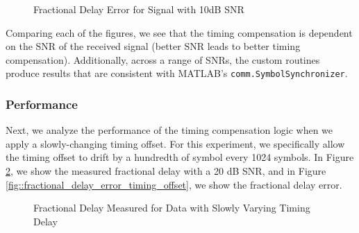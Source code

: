 \documentclass{article}
\begin{document}
\begin{figure}[H]
	\centerline{}
	\caption{Fractional Delay Error for Signal with 10dB SNR}
	\label{fig::delay_error_10dB_snr}
\end{figure}

\noindent Comparing each of the figures, we see that the timing compensation is dependent on the SNR of the received signal (better SNR leads to better timing compensation). Additionally, across a range of SNRs, the custom routines produce results that are consistent with MATLAB's \texttt{comm.SymbolSynchronizer}.

\subsubsection{Performance}

Next, we analyze the performance of the timing compensation logic when we apply a slowly-changing timing offset. For this experiment, we specifically allow the timing offset to drift by a hundredth of symbol every 1024 symbols. In Figure \ref{fig::fractional_delay_timing_offset}, we show the measured fractional delay with a 20 dB SNR, and in Figure \ref{fig::fractional_delay_error_timing_offset}, we show the fractional delay error.

\begin{figure}[H]
	\centerline{}
	\caption{Fractional Delay Measured for Data with Slowly Varying Timing Delay}
	\label{fig::fractional_delay_timing_offset}
\end{figure}
\end{document}
